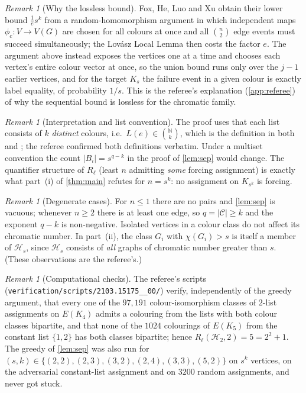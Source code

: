 \documentclass[11pt,a4paper]{article}
\theoremstyle{plain}
\theoremstyle{definition}
\theoremstyle{remark}
\newtheorem{remark}[theorem]{Remark}
\newcommand{\cH}{\mathcal H}
\newcommand{\cC}{\mathcal C}
\newcommand{\N}{\mathbb N}
\newcommand{\Rl}{R_{\ell}}
\begin{document}
\begin{remark}[Why the lossless bound]
Fox, He, Luo and Xu obtain their lower bound $\frac1es^k$ from a random-homomorphism argument in which independent maps $\phi_c:V\to V(G)$ are chosen for all colours at once and all $\binom n2$ edge events must succeed simultaneously; the Lovász Local Lemma then costs the factor $e$. The argument above instead exposes the vertices one at a time and chooses each vertex's entire colour vector at once, so the union bound runs only over the $j-1$ earlier vertices, and for the target $K_s$ the failure event in a given colour is exactly label equality, of probability $1/s$. This is the referee's explanation (\cref{app:referee}) of why the sequential bound is lossless for the chromatic family.
\end{remark}

\begin{remark}[Interpretation and list convention]
The proof uses that each list consists of $k$ \emph{distinct} colours, i.e.\ $L(e)\in\binom{\N}{k}$, which is the definition in both \cite{ABKKS21} and \cite{FHLX21}; the referee confirmed both definitions verbatim. Under a multiset convention the count $|B_i|=s^{q-k}$ in the proof of \cref{lem:sep} would change. The quantifier structure of $\Rl$ (least $n$ admitting \emph{some} forcing assignment) is exactly what part~(i) of \cref{thm:main} refutes for $n=s^k$: no assignment on $K_{s^k}$ is forcing.
\end{remark}

\begin{remark}[Degenerate cases]\label{rem:degenerate}
For $n\le1$ there are no pairs and \cref{lem:sep} is vacuous; whenever $n\ge2$ there is at least one edge, so $q=|\cC|\ge k$ and the exponent $q-k$ is non-negative. Isolated vertices in a colour class do not affect its chromatic number. In part~(ii), the class $G_i$ with $\chi(G_i)>s$ is itself a member of $\cH_s$, since $\cH_s$ consists of \emph{all} graphs of chromatic number greater than $s$. (These observations are the referee's.)
\end{remark}

\begin{remark}[Computational checks]
The referee's scripts (\texttt{verification/scripts/2103.15175\_\_00/}) verify, independently of the greedy argument, that every one of the $97{,}191$ colour-isomorphism classes of $2$-list assignments on $E(K_4)$ admits a colouring from the lists with both colour classes bipartite, and that none of the $1024$ colourings of $E(K_5)$ from the constant list $\{1,2\}$ has both classes bipartite; hence $\Rl(\cH_2,2)=5=2^2+1$. The greedy of \cref{lem:sep} was also run for $(s,k)\in\{(2,2),(2,3),(3,2),(2,4),(3,3),(5,2)\}$ on $s^k$ vertices, on the adversarial constant-list assignment and on $3200$ random assignments, and never got stuck.
\end{remark}
\end{document}
